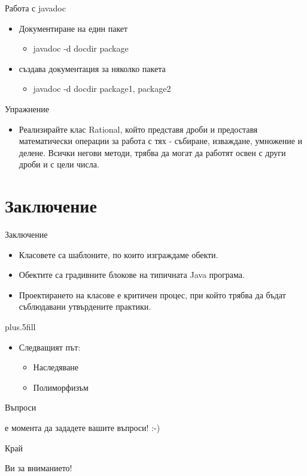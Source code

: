 \documentclass{beamer}
\begin{document}
\begin{frame}{Работа с javadoc}
  \transdissolve
  \begin{itemize}
  \item Документиране на един пакет
    \begin{itemize}
    \item javadoc -d docdir package
    \end{itemize}  \pause
  \item създава документация за няколко пакета
    \begin{itemize}
    \item javadoc -d docdir package1, package2
    \end{itemize}
  \end{itemize}
\end{frame}

\begin{frame}{Упражнение}
  \transdissolve
  \begin{itemize}
    \item Реализирайте клас Rational, който представя дроби и
      предоставя математически операции за работа с тях - събиране,
      изваждане, умножение и делене. Всички негови методи, трябва да
      могат да работят освен с други дроби и с цели числа.
  \end{itemize}
\end{frame}

\section*{Заключение}

\begin{frame}{Заключение}
  \transdissolve
  \begin{itemize}
  \item
    Класовете са шаблоните, по които изграждаме обекти.
  \item
    Обектите са градивните блокове на типичната Java програма.
  \item
    Проектирането на класове е критичен процес, при който трябва да
    бъдат съблюдавани утвърдените практики.
  \end{itemize}
  
  \vskip0pt plus.5fill
  \begin{itemize}
  \item
    Следващият път:
    \begin{itemize}
    \item
      Наследяване
    \item
      Полиморфизъм
    \end{itemize}
  \end{itemize}
\end{frame}

\begin{frame}{Въпроси}
  \transdissolve
  \begin{center}
     е момента да зададете вашите въпроси! :-)
  \end{center}
\end{frame}

\begin{frame}{Край}
  \transdissolve
  \begin{center}
     Ви за вниманието!
  \end{center}
\end{frame}
\end{document}
